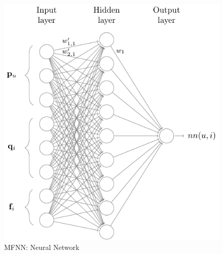 \begin{figure}[p]
	\centering
	\includegraphics[width=0.7\linewidth]{./section-chapter1/figures/mfnn.pdf}
	\caption[MFNN: Neural Network]
	{MFNN: Neural Network}
	\label{f:mfnn}
\end{figure}

